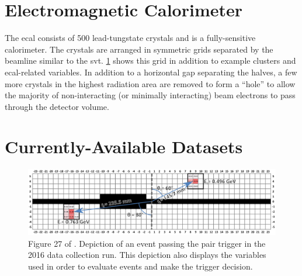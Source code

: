 \section{Electromagnetic Calorimeter}
The \ac{ecal} consists of 500
 lead-tungstate crystals and is a fully-sensitive calorimeter.
The crystals are arranged in symmetric grids separated by the beamline similar to the \ac{svt}.
\cref{fig:hps-pair-trigger-depiction} shows this grid in addition to example clusters and \ac{ecal}-related
variables. In addition to a horizontal gap separating the halves, a few more crystals in the highest
radiation area are removed to form a ``hole'' to allow the majority of non-interacting (or minimally interacting)
beam electrons to pass through the detector volume.

\section{Currently-Available Datasets}

\begin{figure}
    \centering
    \includegraphics[width=\textwidth]{figures/hps/experiment/smckarty-thesis-fig-27-pair-trigger-depiction.png}
    \caption{
        Figure 27 of \cite{skmccarty-thesis-2020}. Depiction of an event passing the pair trigger
        in the 2016 data collection run. This depiction also displays the variables used in order
        to evaluate events and make the trigger decision.
    }
    \label{fig:hps-pair-trigger-depiction}
\end{figure}